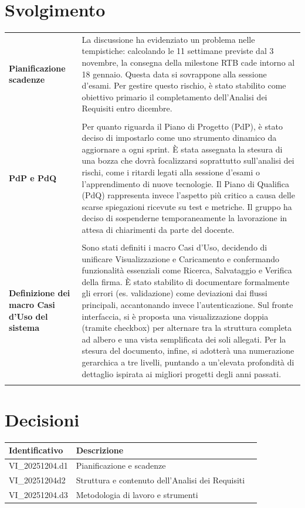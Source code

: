 \documentclass[a4paper,12pt]{article}
\begin{document}
    \section{Svolgimento} {
        \begin{longtable}{P{5cm}|P{10cm}} 
            \textbf{Pianificazione scadenze} & La discussione ha evidenziato un problema  nelle tempistiche: calcolando le 11 settimane previste dal 3 novembre, la consegna della milestone RTB cade intorno al 18 gennaio. Questa data si sovrappone alla sessione d'esami. Per gestire questo rischio, è stato stabilito come obiettivo primario il completamento dell'Analisi dei Requisiti entro dicembre.\\\\
            \textbf{PdP e PdQ} & Per quanto riguarda il Piano di Progetto (PdP), è stato deciso di impostarlo come uno strumento dinamico da aggiornare a ogni sprint. È stata assegnata la stesura di una bozza che dovrà focalizzarsi soprattutto sull'analisi dei rischi, come i ritardi legati alla sessione d'esami o l'apprendimento di nuove tecnologie.
Il Piano di Qualifica (PdQ) rappresenta invece l'aspetto più critico a causa delle scarse spiegazioni ricevute su test e metriche. Il gruppo ha deciso di sospenderne temporaneamente la lavorazione in attesa di chiarimenti da parte del docente.

\\\\
            \textbf{Definizione dei macro Casi d'Uso del sistema} & Sono stati definiti i macro Casi d'Uso, decidendo di unificare Visualizzazione e Caricamento e confermando funzionalità essenziali come Ricerca, Salvataggio e Verifica della firma. È stato stabilito di documentare formalmente gli errori (es. validazione) come deviazioni dai flussi principali, accantonando invece l'autenticazione.
Sul fronte interfaccia, si è proposta una visualizzazione\textbf{ }doppia (tramite checkbox) per alternare tra la struttura completa ad albero e una vista semplificata dei soli allegati. Per la stesura del documento, infine, si adotterà una numerazione gerarchica a tre livelli, puntando a un'elevata profondità di dettaglio ispirata ai migliori progetti degli anni passati.\\\\
        \end{longtable}
    }

    \section{Decisioni} {
        \begin{tabularx}{\textwidth}{|l|X|l|}
            \hline
            \textbf{Identificativo} & \textbf{Descrizione}\\
            \hline
            VI\_20251204.d1 & Pianificazione e scadenze \\
            \hline
            VI\_20251204d2 & Struttura e contenuto dell'Analisi dei Requisiti \\
            \hline
            VI\_20251204.d3 & Metodologia di lavoro e strumenti\\
            \hline
        \end{tabularx}
    }
\end{document}

